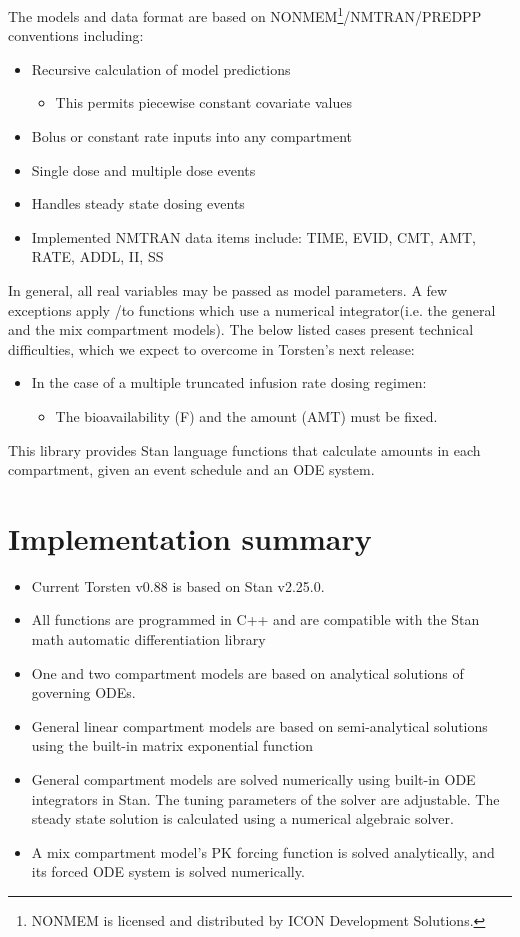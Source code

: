 \documentclass[10pt, reqno, oneside]{amsbook}
\numberwithin{equation}{chapter}
\numberwithin{figure}{chapter}
\numberwithin{table}{chapter}
\theoremstyle{remark}
\begin{document}
The models and data format are based on
NONMEM\textregistered{}\footnote{NONMEM\textregistered{} is licensed and distributed by ICON Development Solutions.}/NMTRAN/PREDPP
conventions including:
\begin{itemize}
\item Recursive calculation of model predictions
\begin{itemize}
\item This permits piecewise constant covariate values
\end{itemize}
\item Bolus or constant rate inputs into any compartment
\item Single dose and multiple dose events
\item Handles steady state dosing events
\item Implemented NMTRAN data items include: TIME, EVID, CMT, AMT, RATE, ADDL, II, SS
\end{itemize}

In general, all real variables may be passed as model parameters. A
few exceptions apply /to functions which use a numerical
integrator(i.e. the general and the mix compartment
models). The below listed cases present technical difficulties, which we expect to
overcome in Torsten's next release:
\begin{itemize}
\item In the case of a multiple truncated infusion rate dosing regimen:
\begin{itemize}
\item The bioavailability (F) and the amount (AMT) must be fixed.
\end{itemize}
\end{itemize}

This library provides Stan language functions that calculate amounts
in each compartment, given an event schedule and an ODE system.

\section{Implementation summary}
\label{imp_details}
\begin{itemize}
\item Current Torsten v0.88 is based on Stan v2.25.0.
\item All functions are programmed in C++ and are compatible
with the Stan math automatic differentiation library \cite{carpenter15_stan_math_librar}
\item One and two compartment models are based on analytical solutions of governing ODEs.
\item General linear compartment models are based on semi-analytical solutions using the built-in matrix exponential function
\item General compartment models are solved numerically using built-in ODE integrators in Stan. The tuning parameters of the solver are adjustable. The steady state solution is calculated using a numerical algebraic solver.
\item A mix compartment model's PK forcing function is solved analytically, and its forced ODE system is solved numerically.
\end{itemize}
\end{document}

